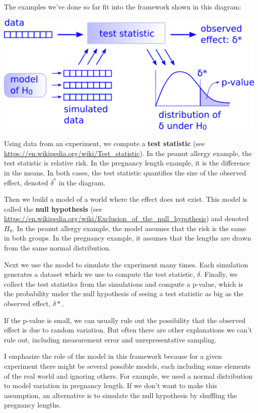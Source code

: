 The examples we've done so far fit into the framework shown in this
diagram:

\includegraphics{figs/hypothesis_testing.png}

Using data from an experiment, we compute a \textbf{test statistic} (see
\url{https://en.wikipedia.org/wiki/Test_statistic}). In the peanut
allergy example, the test statistic is relative risk. In the pregnancy
length example, it is the difference in the means. In both cases, the
test statistic quantifies the size of the observed effect, denoted
\(\delta^*\) in the diagram.

Then we build a model of a world where the effect does not exist. This
model is called the \textbf{null hypothesis} (see
\url{https://en.wikipedia.org/wiki/Exclusion_of_the_null_hypothesis})
and denoted \(H_0\). In the peanut allergy example, the model assumes
that the risk is the same in both groups. In the pregnancy example, it
assumes that the lengths are drawn from the same normal distribution.

Next we use the model to simulate the experiment many times. Each
simulation generates a dataset which we use to compute the test
statistic, \(\delta\). Finally, we collect the test statistics from the
simulations and compute a p-value, which is the probability under the
null hypothesis of seeing a test statistic as big as the observed
effect, \(\delta*\).

If the p-value is small, we can usually rule out the possibility that
the observed effect is due to random variation. But often there are
other explanations we can't rule out, including measurement error and
unrepresentative sampling.

I emphasize the role of the model in this framework because for a given
experiment there might be several possible models, each including some
elements of the real world and ignoring others. For example, we used a
normal distribution to model variation in pregnancy length. If we don't
want to make this assumption, an alternative is to simulate the null
hypothesis by shuffling the pregnancy lengths.

